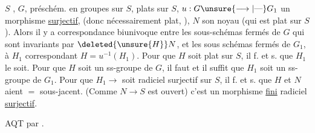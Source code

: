   $S$  ,
\margin{\rule[-2\baselineskip]{0.35pt}{2\baselineskip}}$G$,  préschém. en groupes  sur $S$, 
plats sur $S$, $u:G\unsure{\longrightarrow|\text{---}}G_1$ un morphisme 
\uline{surjectif}, (donc nécessairement plat, ),
$N$ son noyau (qui est  plat sur $S$).
Alors il y a correspondance biunivoque
\margin{\rule[-10\baselineskip]{0.35pt}{10\baselineskip}}entre les sous-schémas fermés  de
$G$ qui sont invariants par $\deleted{\unsure{H}}N$, et les
sous schémas fermés  de  $G_1$, à $H_1$
correspondant $H=u^{-1}(H_1)$. Pour que
$H$ soit  plat sur $S$, il f. et s. que
$H_1$ le soit. Pour que $H$ soit un
ss-groupe de $G$, il faut et il suffit que
$H_1$ soit un ss-groupe de $G_1$. Pour
que  $H_1\longrightarrow$ soit radiciel surjectif
sur $S$, il f. et s. que $H$ et $N$ aient
$=$   sous-jacent.  (Comme
$N\longrightarrow S$  est  ouvert) c'est un morphisme
\uline{fini} radiciel \uline{surjectif}.

AQT par .
